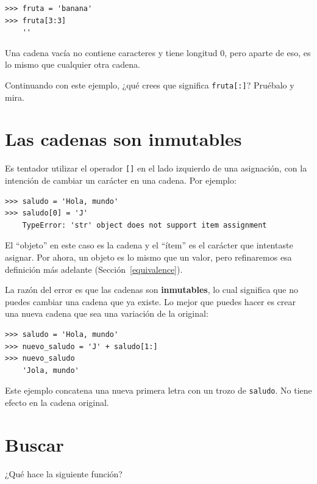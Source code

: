 \documentclass[10pt]{book}
\begin{document}
\begin{verbatim}
>>> fruta = 'banana'
>>> fruta[3:3]
    ''
\end{verbatim}
%
Una cadena vacía no contiene caracteres y tiene longitud 0, pero aparte
de eso, es lo mismo que cualquier otra cadena.

Continuando con este ejemplo, ¿qué crees que significa
{\tt fruta[:]}?  Pruébalo y mira.



\section{Las cadenas son inmutables}

Es tentador utilizar el operador {\tt []} en el lado izquierdo de una
asignación, con la intención de cambiar un carácter en una cadena.
Por ejemplo:

\begin{verbatim}
>>> saludo = 'Hola, mundo'
>>> saludo[0] = 'J'
    TypeError: 'str' object does not support item assignment
\end{verbatim}
%
El ``objeto'' en este caso es la cadena y el ``ítem'' es
el carácter que intentaste asignar.  Por ahora, un objeto es
lo mismo que un valor, pero refinaremos esa definición
más adelante (Sección~\ref{equivalence}).

La razón del error es que
las cadenas son {\bf inmutables}, lo cual significa que no puedes cambiar una
cadena que ya existe.  Lo mejor que puedes hacer es crear una nueva cadena
que sea una variación de la original:

\begin{verbatim}
>>> saludo = 'Hola, mundo'
>>> nuevo_saludo = 'J' + saludo[1:]
>>> nuevo_saludo
    'Jola, mundo'
\end{verbatim}
%
Este ejemplo concatena una nueva primera letra con
un trozo de {\tt saludo}.  No tiene efecto en
la cadena original.


\section{Buscar}
\label{find}

¿Qué hace la siguiente función?
\end{document}
